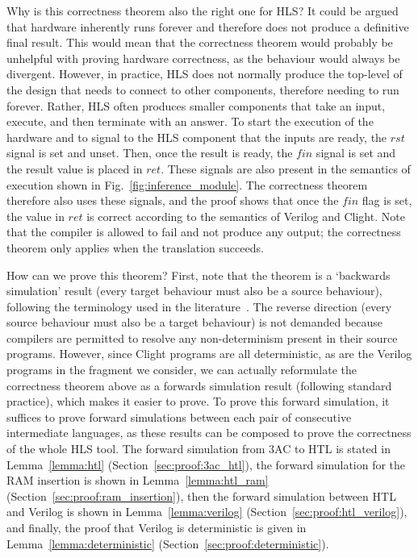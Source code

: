 Why is this correctness theorem also the right one for HLS? It could be argued that hardware inherently runs forever and therefore does not produce a definitive final result.  This would mean that the \compcert{} correctness theorem would probably be unhelpful with proving hardware correctness, as the behaviour would always be divergent.  However, in practice, HLS does not normally produce the top-level of the design that needs to connect to other components, therefore needing to run forever.  Rather, HLS often produces smaller components that take an input, execute, and then terminate with an answer.  To start the execution of the hardware and to signal to the HLS component that the inputs are ready, the $\mathit{rst}$ signal is set and unset.  Then, once the result is ready, the $\mathit{fin}$ signal is set and the result value is placed in $\mathit{ret}$.  These signals are also present in the semantics of execution shown in Fig.~\ref{fig:inference_module}.  The correctness theorem therefore also uses these signals, and the proof shows that once the $\mathit{fin}$ flag is set, the value in $\mathit{ret}$ is correct according to the semantics of Verilog and Clight.  Note that the compiler is allowed to fail and not produce any output; the correctness theorem only applies when the translation succeeds.

How can we prove this theorem? First, note that the theorem is a `backwards simulation' result (every target behaviour must also be a source behaviour), following the terminology used in the \compcert{} literature~\cite{leroy09_formal_verif_realis_compil}. The reverse direction (every source behaviour must also be a target behaviour) is not demanded because compilers are permitted to resolve any non-determinism present in their source programs. However, since Clight programs are all deterministic, as are the Verilog programs in the fragment we consider, we can actually reformulate the correctness theorem above as a forwards simulation result (following standard \compcert{} practice), which makes it easier to prove.
To prove this forward simulation, it suffices to prove forward simulations between each pair of consecutive intermediate languages, as these results can be composed to prove the correctness of the whole HLS tool.
The forward simulation from 3AC to HTL is stated in Lemma~\ref{lemma:htl} (Section~\ref{sec:proof:3ac_htl}), the forward simulation for the RAM insertion is shown in Lemma~\ref{lemma:htl_ram} (Section~\ref{sec:proof:ram_insertion}), then the forward simulation between HTL and Verilog is shown in Lemma~\ref{lemma:verilog} (Section~\ref{sec:proof:htl_verilog}), and finally, the proof that Verilog is deterministic is given in Lemma~\ref{lemma:deterministic} (Section~\ref{sec:proof:deterministic}).

